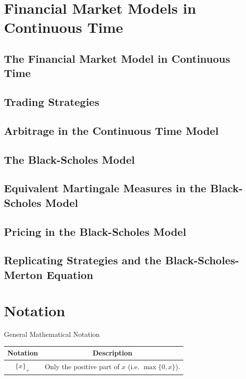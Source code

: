 \documentclass[11pt,a4paper]{article}
\begin{document}
\section{Financial Market Models in Continuous Time} \label{sec_financial_market_models_in_continuous_time}

\subsection{The Financial Market Model in Continuous Time}

\subsection{Trading Strategies}

\subsection{Arbitrage in the Continuous Time Model}

\subsection{The Black-Scholes Model}

\subsection{Equivalent Martingale Measures in the Black-Scholes Model}

\subsection{Pricing in the Black-Scholes Model}

\subsection{Replicating Strategies and the Black-Scholes-Merton Equation}

\section{Notation}

  \begin{notation}{General Mathematical Notation}
    \begin{tabular}{c|c}
      Notation&Description\\\hline
      $\{x\}_+$&Only the positive part of $x$ (i.e. $\max\{0,x\}$).
    \end{tabular}
  \end{notation}
\end{document}
